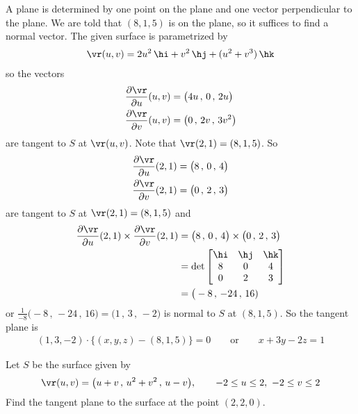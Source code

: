 \begin{solution} 
A plane is determined by one point on the plane and one vector 
perpendicular to the plane. We are told that $(8,1,5)$ is on the plane,
so it suffices to find a normal vector. The given surface is parametrized by
\begin{align*}
\vr(u,v) = 2u^2\,\hi + v^2\,\hj +(u^2+v^3)\,\hk
\end{align*}
so the vectors 
\begin{align*}
\frac{\partial \vr}{\partial u}(u,v)
 &= \big(4u\,,\, 0 \,,\, 2u\big) \\
\frac{\partial \vr}{\partial v}(u,v)
 &= \big(0\,,\, 2v \,,\, 3v^2\big) 
\end{align*}
are tangent to $S$ at $\vr(u,v)$. Note that $\vr(2,1)=(8,1,5)$.
So 
\begin{align*}
\frac{\partial \vr}{\partial u}(2,1)
 &= \big(8\,,\, 0 \,,\, 4\big) \\
\frac{\partial \vr}{\partial v}(2,1)
 &= \big(0\,,\, 2\,,\, 3\big) 
\end{align*}
are tangent to $S$ at $\vr(2,1)=(8,1,5)$ and
\begin{align*}
\frac{\partial \vr}{\partial u}(2,1) \times
     \frac{\partial \vr}{\partial v}(2,1)
&=\big(8\,,\, 0 \,,\, 4\big)\times \big(0\,,\, 2\,,\, 3\big)  \\
&=\det\left[\begin{matrix}
                      \hi & \hj & \hk \\
                      8   & 0  &  4  \\
                      0   & 2  &  3 \end{matrix} \right] \\ 
&= \big(-8\,,\,-24\,,\,16)
\end{align*}
or $\frac{1}{-8}\big(-8\,,\,-24\,,\,16) = \big(1\,,\,3\,,\,-2)$
is normal to $S$ at $(8,1,5)$. So the tangent plane is
\begin{align*}
(1,3,-2)\cdot\big\{(x,y,z)-(8,1,5)\big\}=0\qquad\text{or}\qquad
x+3y-2z = 1
\end{align*}


\end{solution}


\begin{question}[M317 2010D]   %
Let $S$ be the surface given by
\begin{equation*}
\vr(u, v) = \big( u + v\,,\, u^2 + v^2 \,,\, u - v\big),\qquad
-2 \le u \le 2,\ -2 \le v \le 2
\end{equation*}
Find the tangent plane to the surface at the point $(2, 2, 0)$.
\end{question}

